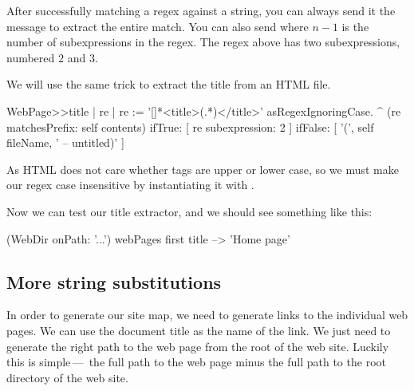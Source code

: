 \documentclass[a4paper,10pt,twoside]{book}
\begin{document}
After successfully matching a regex against a string, you can always send it the message  to extract the entire match.  You can also send  where $n-1$ is the number of subexpressions in the regex. The regex above has two subexpressions, numbered $2$ and $3$.

We will use the same trick to extract the title from an HTML file.


\begin{code}{}
WebPage>>title
	| re |
	re := '[\w\W]*<title>(.*)</title>' asRegexIgnoringCase.
	^ (re matchesPrefix: self contents)
		ifTrue: [ re subexpression: 2 ]
		ifFalse: [ '(', self fileName, ' -- untitled)' ]
\end{code}

As HTML does not care whether tags are upper or lower case, so we must make our regex case insensitive by instantiating it with .


Now we can test our title extractor, and we should see something like this:

\begin{code}{}
(WebDir onPath: '...') webPages first title --> 'Home page'
\end{code}

\subsection{More string substitutions}

In order to generate our site map, we need to generate links to the individual web pages.
We can use the document title as the name of the link.  We just need to generate the right path to the web page from the root of the web site.
Luckily this is simple\,---\ the full path to the web page minus the full path to the root directory of the web site.
\end{document}
